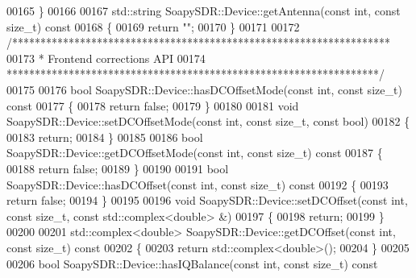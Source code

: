 \begin{DoxyCode}
00165 \}
00166 
00167 std::string SoapySDR::Device::getAntenna(\textcolor{keyword}{const} \textcolor{keywordtype}{int}, \textcolor{keyword}{const} \textcolor{keywordtype}{size\_t})\textcolor{keyword}{ const}
00168 \textcolor{keyword}{}\{
00169     \textcolor{keywordflow}{return} \textcolor{stringliteral}{""};
00170 \}
00171 
00172 \textcolor{comment}{/*******************************************************************}
00173 \textcolor{comment}{ * Frontend corrections API}
00174 \textcolor{comment}{ ******************************************************************/}
00175 
00176 \textcolor{keywordtype}{bool} SoapySDR::Device::hasDCOffsetMode(\textcolor{keyword}{const} \textcolor{keywordtype}{int}, \textcolor{keyword}{const} \textcolor{keywordtype}{size\_t})\textcolor{keyword}{ const}
00177 \textcolor{keyword}{}\{
00178     \textcolor{keywordflow}{return} \textcolor{keyword}{false};
00179 \}
00180 
00181 \textcolor{keywordtype}{void} SoapySDR::Device::setDCOffsetMode(\textcolor{keyword}{const} \textcolor{keywordtype}{int}, \textcolor{keyword}{const} \textcolor{keywordtype}{size\_t}, \textcolor{keyword}{const} \textcolor{keywordtype}{bool})
00182 \{
00183     \textcolor{keywordflow}{return};
00184 \}
00185 
00186 \textcolor{keywordtype}{bool} SoapySDR::Device::getDCOffsetMode(\textcolor{keyword}{const} \textcolor{keywordtype}{int}, \textcolor{keyword}{const} \textcolor{keywordtype}{size\_t})\textcolor{keyword}{ const}
00187 \textcolor{keyword}{}\{
00188     \textcolor{keywordflow}{return} \textcolor{keyword}{false};
00189 \}
00190 
00191 \textcolor{keywordtype}{bool} SoapySDR::Device::hasDCOffset(\textcolor{keyword}{const} \textcolor{keywordtype}{int}, \textcolor{keyword}{const} \textcolor{keywordtype}{size\_t})\textcolor{keyword}{ const}
00192 \textcolor{keyword}{}\{
00193     \textcolor{keywordflow}{return} \textcolor{keyword}{false};
00194 \}
00195 
00196 \textcolor{keywordtype}{void} SoapySDR::Device::setDCOffset(\textcolor{keyword}{const} \textcolor{keywordtype}{int}, \textcolor{keyword}{const} \textcolor{keywordtype}{size\_t}, \textcolor{keyword}{const} std::complex<double> &)
00197 \{
00198     \textcolor{keywordflow}{return};
00199 \}
00200 
00201 std::complex<double> SoapySDR::Device::getDCOffset(\textcolor{keyword}{const} \textcolor{keywordtype}{int}, \textcolor{keyword}{const} \textcolor{keywordtype}{size\_t})\textcolor{keyword}{ const}
00202 \textcolor{keyword}{}\{
00203     \textcolor{keywordflow}{return} std::complex<double>();
00204 \}
00205 
00206 \textcolor{keywordtype}{bool} SoapySDR::Device::hasIQBalance(\textcolor{keyword}{const} \textcolor{keywordtype}{int}, \textcolor{keyword}{const} \textcolor{keywordtype}{size\_t})\textcolor{keyword}{ const}

\end{DoxyCode}
